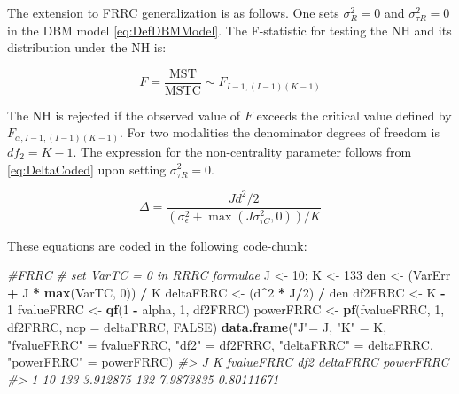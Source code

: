 \documentclass[
]{book}
\newenvironment{Shaded}{\begin{snugshade}}{\end{snugshade}}
\newcommand{\CommentTok}[1]{\textcolor[rgb]{0.56,0.35,0.01}{\textit{#1}}}
\newcommand{\DataTypeTok}[1]{\textcolor[rgb]{0.13,0.29,0.53}{#1}}
\newcommand{\DecValTok}[1]{\textcolor[rgb]{0.00,0.00,0.81}{#1}}
\newcommand{\KeywordTok}[1]{\textcolor[rgb]{0.13,0.29,0.53}{\textbf{#1}}}
\newcommand{\NormalTok}[1]{#1}
\newcommand{\OperatorTok}[1]{\textcolor[rgb]{0.81,0.36,0.00}{\textbf{#1}}}
\newcommand{\OtherTok}[1]{\textcolor[rgb]{0.56,0.35,0.01}{#1}}
\newcommand{\StringTok}[1]{\textcolor[rgb]{0.31,0.60,0.02}{#1}}
\begin{document}
The extension to FRRC generalization is as follows. One sets \(\sigma_R^2 = 0\) and \(\sigma_{\tau R}^2 = 0\) in the DBM model \eqref{eq:DefDBMModel}. The F-statistic for testing the NH and its distribution under the NH is:

\begin{equation}
F=\frac{\text{MST}}{\text{MSTC}} \sim F_{I-1,(I-1)(K-1)}
\label{eq:DefFStatFRRC-DBM1}
\end{equation}

The NH is rejected if the observed value of \(F\) exceeds the critical value defined by \(F_{\alpha, I-1,(I-1)(K-1)}\). For two modalities the denominator degrees of freedom is \(df_2 = K-1\). The expression for the non-centrality parameter follows from \eqref{eq:DeltaCoded} upon setting \(\sigma_{\tau R}^2 = 0\).

\begin{equation}
\Delta=\frac{Jd^2/2}{(\sigma_{\epsilon}^2+\max(J\sigma_{\tau C}^2,0))/K}
\label{eq:DefDeltaFRRC}
\end{equation}

These equations are coded in the following code-chunk:

\begin{Shaded}
\begin{Highlighting}[]
\CommentTok{#FRRC}
\CommentTok{# set VarTC = 0 in RRRC formulae}
\NormalTok{J <-}\StringTok{ }\DecValTok{10}\NormalTok{; K <-}\StringTok{ }\DecValTok{133}
\NormalTok{den <-}\StringTok{ }\NormalTok{(VarErr }\OperatorTok{+}\StringTok{ }\NormalTok{J }\OperatorTok{*}\StringTok{ }\KeywordTok{max}\NormalTok{(VarTC, }\DecValTok{0}\NormalTok{)) }\OperatorTok{/}\StringTok{ }\NormalTok{K}
\NormalTok{deltaFRRC <-}\StringTok{ }\NormalTok{(d}\OperatorTok{^}\DecValTok{2} \OperatorTok{*}\StringTok{ }\NormalTok{J}\OperatorTok{/}\DecValTok{2}\NormalTok{) }\OperatorTok{/}\StringTok{ }\NormalTok{den}
\NormalTok{df2FRRC <-}\StringTok{ }\NormalTok{K }\OperatorTok{-}\StringTok{ }\DecValTok{1}
\NormalTok{fvalueFRRC <-}\StringTok{ }\KeywordTok{qf}\NormalTok{(}\DecValTok{1} \OperatorTok{-}\StringTok{ }\NormalTok{alpha, }\DecValTok{1}\NormalTok{, df2FRRC)}
\NormalTok{powerFRRC <-}\StringTok{ }\KeywordTok{pf}\NormalTok{(fvalueFRRC, }\DecValTok{1}\NormalTok{, df2FRRC, }\DataTypeTok{ncp =}\NormalTok{ deltaFRRC, }\OtherTok{FALSE}\NormalTok{)}
\KeywordTok{data.frame}\NormalTok{(}\StringTok{"J"}\NormalTok{=}\StringTok{ }\NormalTok{J,  }\StringTok{"K"}\NormalTok{ =}\StringTok{ }\NormalTok{K, }\StringTok{"fvalueFRRC"}\NormalTok{ =}\StringTok{ }\NormalTok{fvalueFRRC, }\StringTok{"df2"}\NormalTok{ =}\StringTok{ }\NormalTok{df2FRRC, }\StringTok{"deltaFRRC"}\NormalTok{ =}\StringTok{ }\NormalTok{deltaFRRC, }\StringTok{"powerFRRC"}\NormalTok{ =}\StringTok{ }\NormalTok{powerFRRC)}
\CommentTok{#>    J   K fvalueFRRC df2 deltaFRRC  powerFRRC}
\CommentTok{#> 1 10 133   3.912875 132 7.9873835 0.80111671}
\end{Highlighting}
\end{Shaded}
\end{document}
